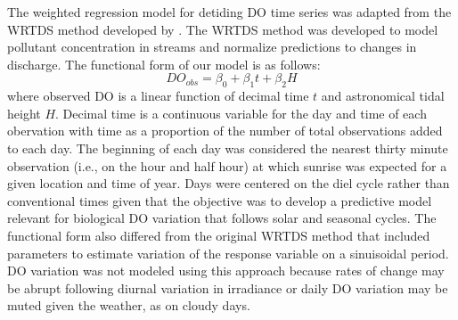 \documentclass[letterpaper,12pt,oneside]{article}\usepackage[]{graphicx}\usepackage[]{color}
\begin{document}
The weighted regression model for detiding \ac{DO} time series was adapted from the \ac{WRTDS} method developed by \citet{Hirsch10}.  The \ac{WRTDS} method was developed to model pollutant concentration in streams and normalize predictions to changes in discharge.  The functional form of our model is as follows:
\begin{equation}\label{funform}
DO_{obs}= \beta_0 + \beta_1 t + \beta_2 H
\end{equation}
where observed \ac{DO} is a linear function of decimal time $t$ and astronomical tidal height $H$. Decimal time is a continuous variable for the day and time of each obervation with time as a proportion of the number of total observations added to each day.  The beginning of each day was considered the nearest thirty minute observation (i.e., on the hour and half hour) at which sunrise was expected for a given location and time of year.  Days were centered on the diel cycle rather than conventional times given that the objective was to develop a predictive model relevant for biological \ac{DO} variation that follows solar and seasonal cycles.  The functional form also differed from the original \ac{WRTDS} method that included parameters to estimate variation of the response variable on a sinuisoidal period.  \ac{DO} variation was not modeled using this approach because rates of change may be abrupt following diurnal variation in irradiance or daily \ac{DO} variation may be muted given the weather, as on cloudy days.
\end{document}
